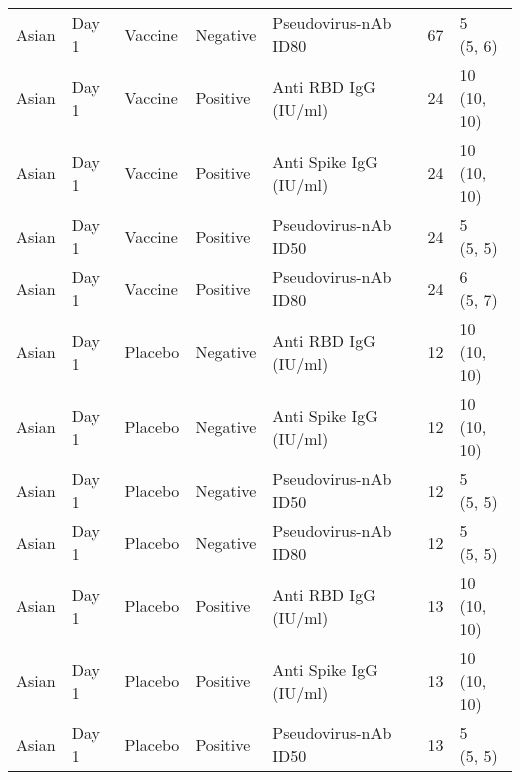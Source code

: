 \documentclass[]{book}
\theoremstyle{definition}
\theoremstyle{definition}
\theoremstyle{definition}
\newcommand{\1}{\mathbbm{1}}
\begin{document}
\begin{landscape}
\begin{ThreePartTable}
\begin{longtable}[t]{>{\raggedright\arraybackslash}p{7cm}llllll}
\hspace{1em}Asian & Day 1 & Vaccine & Negative & Pseudovirus-nAb ID80 & 67 & \makecell[l]{5\\(5, 6)}\\
\hspace{1em}Asian & Day 1 & Vaccine & Positive & Anti RBD IgG (IU/ml) & 24 & \makecell[l]{10\\(10, 10)}\\
\hspace{1em}Asian & Day 1 & Vaccine & Positive & Anti Spike IgG (IU/ml) & 24 & \makecell[l]{10\\(10, 10)}\\
\hspace{1em}Asian & Day 1 & Vaccine & Positive & Pseudovirus-nAb ID50 & 24 & \makecell[l]{5\\(5, 5)}\\
\hspace{1em}Asian & Day 1 & Vaccine & Positive & Pseudovirus-nAb ID80 & 24 & \makecell[l]{6\\(5, 7)}\\
\hspace{1em}Asian & Day 1 & Placebo & Negative & Anti RBD IgG (IU/ml) & 12 & \makecell[l]{10\\(10, 10)}\\
\hspace{1em}Asian & Day 1 & Placebo & Negative & Anti Spike IgG (IU/ml) & 12 & \makecell[l]{10\\(10, 10)}\\
\hspace{1em}Asian & Day 1 & Placebo & Negative & Pseudovirus-nAb ID50 & 12 & \makecell[l]{5\\(5, 5)}\\
\hspace{1em}Asian & Day 1 & Placebo & Negative & Pseudovirus-nAb ID80 & 12 & \makecell[l]{5\\(5, 5)}\\
\hspace{1em}Asian & Day 1 & Placebo & Positive & Anti RBD IgG (IU/ml) & 13 & \makecell[l]{10\\(10, 10)}\\
\hspace{1em}Asian & Day 1 & Placebo & Positive & Anti Spike IgG (IU/ml) & 13 & \makecell[l]{10\\(10, 10)}\\
\hspace{1em}Asian & Day 1 & Placebo & Positive & Pseudovirus-nAb ID50 & 13 & \makecell[l]{5\\(5, 5)}\\

\end{longtable}
\end{ThreePartTable}
\end{landscape}
\end{document}

